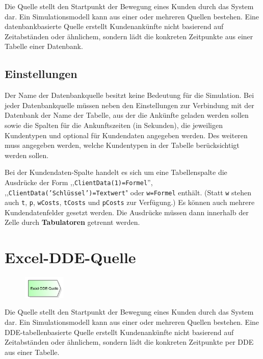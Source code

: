 Die Quelle stellt den Startpunkt der Bewegung eines Kunden durch das System dar.
Ein Simulationsmodell kann aus einer oder mehreren Quellen bestehen.
Eine datenbankbasierte Quelle erstellt Kundenankünfte nicht basierend auf
Zeitabständen oder ähnlichem, sondern lädt die konkreten Zeitpunkte aus einer
Tabelle einer Datenbank.

\subsection*{Einstellungen}

Der Name der Datenbankquelle besitzt keine Bedeutung für die Simulation.
Bei jeder Datenbankquelle müssen neben den Einstellungen zur Verbindung mit
der Datenbank der Name der Tabelle, aus der die Ankünfte geladen werden sollen
sowie die Spalten für die Ankunftszeiten (in Sekunden), die jeweiligen Kundentypen
und optional für Kundendaten angegeben werden. Des weiteren muss angegeben werden,
welche Kundentypen in der Tabelle berücksichtigt werden sollen.

Bei der Kundendaten-Spalte handelt es sich um eine Tabellenspalte die Ausdrücke
der Form ,,\texttt{ClientData(1)=Formel}'', ,,\texttt{ClientData('Schlüssel')=Textwert}"
oder \texttt{w=Formel} enthält. (Statt \texttt{w} stehen auch \texttt{t}, \texttt{p},
\texttt{wCosts}, \texttt{tCosts} und \texttt{pCosts} zur Verfügung.)
Es können auch mehrere Kundendatenfelder gesetzt werden.
Die Ausdrücke müssen dann innerhalb der Zelle durch \textbf{Tabulatoren} getrennt werden. 


\section{Excel-DDE-Quelle}
\label{ref:ModelElementSourceDDE}

\begin{figure}
\vspace{-22pt}
\includegraphics[width=2cm]{imageModelElementSourceDDE.png}
\vspace{-22pt}
\end{figure}

Die Quelle stellt den Startpunkt der Bewegung eines Kunden durch das System dar.
Ein Simulationsmodell kann aus einer oder mehreren Quellen bestehen.
Eine DDE-tabellenbasierte Quelle erstellt Kundenankünfte nicht basierend auf
Zeitabständen oder ähnlichem, sondern lädt die konkreten Zeitpunkte per DDE
aus einer Tabelle.

